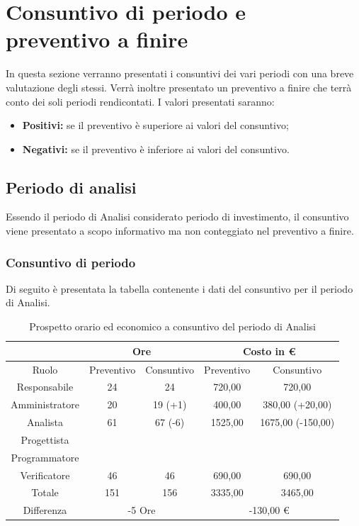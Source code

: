 \documentclass[./PianodiProgetto.tex]{subfiles}
\begin{document}
\chapter{Consuntivo di periodo e \\ preventivo a finire}
In questa sezione verranno presentati i consuntivi dei vari periodi con una
breve valutazione degli stessi. Verrà inoltre presentato un preventivo a finire
che terrà conto dei soli periodi rendicontati. I valori presentati saranno:
\begin{itemize}
\item \textbf{Positivi:} se il preventivo è superiore ai valori del consuntivo;
\item \textbf{Negativi:} se il preventivo è inferiore ai valori del consuntivo.
\end{itemize}

\section{Periodo di analisi}
Essendo il periodo di Analisi considerato periodo di investimento, il consuntivo viene presentato a scopo informativo ma non conteggiato nel preventivo a finire.

\subsection{Consuntivo di periodo}
Di seguito è presentata la tabella contenente i dati del consuntivo per il
periodo di Analisi.

\begin{table}[H]
	\centering
	\begin{tabular}{|c|c|c|c|c|}
		\hline
	 	 & \multicolumn{2}{c|}{Ore} & \multicolumn{2}{c|}{Costo in \euro{}}  \\ \hline
		Ruolo&Preventivo&Consuntivo&Preventivo&Consuntivo \\ \hline
		Responsabile&24&24&720,00&720,00  \\ \hline
		Amministratore&20&19 (+1)&400,00&380,00 (+20,00)  \\ \hline
		Analista&61&67 (-6)&1525,00&1675,00 (-150,00)  \\ \hline
		Progettista& & & &  \\ \hline
		Programmatore& & & &  \\ \hline
		Verificatore&46&46&690,00&690,00  \\ \hline
		Totale&151&156&3335,00&3465,00  \\ \hline
		Differenza& \multicolumn{2}{c|}{-5 Ore} & \multicolumn{2}{c|}{-130,00 \euro{}} \\ \hline
	\end{tabular}
	\caption{Prospetto orario ed economico a consuntivo del periodo di Analisi}
\end{table}
\end{document}
